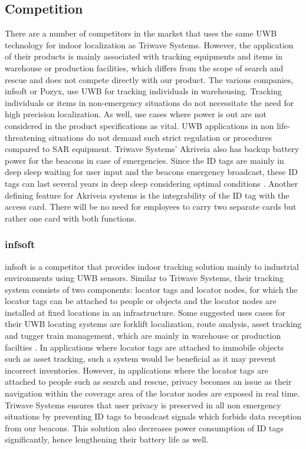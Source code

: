 \subsection{Competition}
There are a number of competitors in the market that uses the same UWB technology for indoor localization as Triwave Systems. 
However, the application of their products is mainly associated with tracking equipments and items in warehouse or production facilities, 
which differs from the scope of search and rescue and does not compete directly with our product. The various companies, infsoft or Pozyx, use 
UWB for tracking individuals in warehousing. Tracking individuals or items in non-emergency situations do not necessitate the need for high 
precision localization. As well, use cases where power is out are not considered in the product specifications as vital. UWB applications in non 
life-threatening situations do not demand such strict regulation or procedures compared to SAR equipment. Triwave Systems' Akriveia also has 
backup battery power for the beacons in case of emergencies. Since the ID tags are mainly in deep sleep waiting for user input and the beacons 
emergency broadcast, these ID tags can last several years in deep sleep considering optimal conditions \cite{R3-5}. Another defining feature for 
Akriveia systems is the integrability of the ID tag with the access card. There will be no need for employees to carry two separate cards but 
rather one card with both functions. 

\subsubsection{infsoft}
infsoft is a competitor that provides indoor tracking solution mainly to industrial environments using UWB sensors. 
Similar to Triwave Systems, their tracking system consists of two components: locator tags and locator nodes, for which the locator tags 
can be attached to people or objects and the locator nodes are installed at fixed locations in an infrastructure. Some suggested uses cases 
for their UWB locating systems are forklift localization, route analysis, asset tracking and tugger train management, which are mainly in 
warehouse or production facilties \cite{R3-6}. In applications where locator tags are attached to immobile objects such as asset tracking, 
such a system would be beneficial as it may prevent incorrect inventories. However, in applications where the locator tags are attached to 
people such as search and rescue, privacy becomes an issue as their navigation within the coverage area of the locator nodes are exposed in 
real time. Triwave Systems ensures that user privacy is preserved in all non emergency situations by preventing ID tags to broadcast signals 
which forbids data reception from our beacons. This solution also decreases power consumption of ID tags significantly, hence lengthening 
their battery life as well. 

